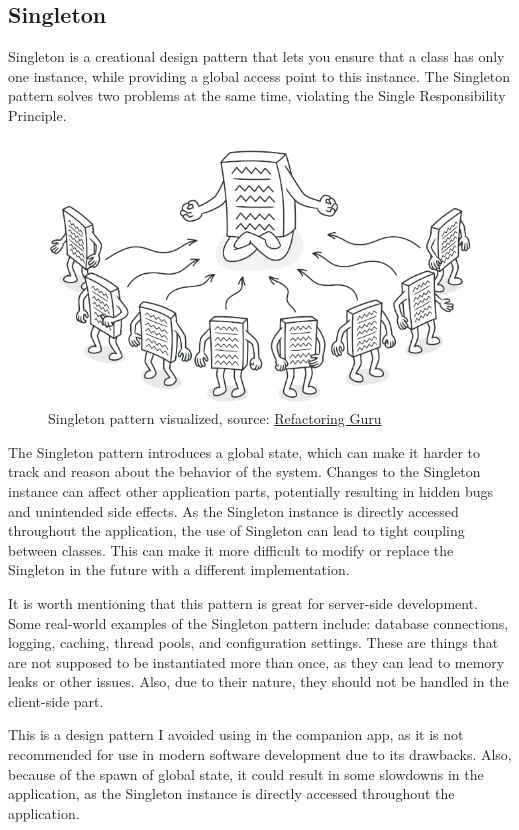 \subsection{Singleton}
Singleton is a creational design pattern that lets you ensure that a class has only one instance, while providing a global access point to this instance.
The Singleton pattern solves two problems at the same time, violating the Single Responsibility Principle.
\begin{figure}[htbp]
    \centering
    \includegraphics[scale=0.4]{pictures/singleton.png}
    \caption{Singleton pattern visualized, source: \href{https://rezababakhani.ir/blog/singleton-design-pattern}{Refactoring Guru}}
    \label{singletonExample}
\end{figure}
\par
The Singleton pattern introduces a global state, which can make it harder to track and reason about the behavior of the system.
Changes to the Singleton instance can affect other application parts, potentially resulting in hidden bugs and unintended side effects.
As the Singleton instance is directly accessed throughout the application, the use of Singleton can lead to tight coupling between classes. 
This can make it more difficult to modify or replace the Singleton in the future with a different implementation.
\par
It is worth mentioning that this pattern is great for server-side development.
Some real-world examples of the Singleton pattern include: database connections, logging, caching, thread pools, and configuration settings.
These are things that are not supposed to be instantiated more than once, as they can lead to memory leaks or other issues.
Also, due to their nature, they should not be handled in the client-side part.
\par
This is a design pattern I avoided using in the companion app, as it is not recommended for use in modern software development due to its drawbacks.
Also, because of the spawn of global state, it could result in some slowdowns in the application, as the Singleton instance is directly accessed throughout the application.


